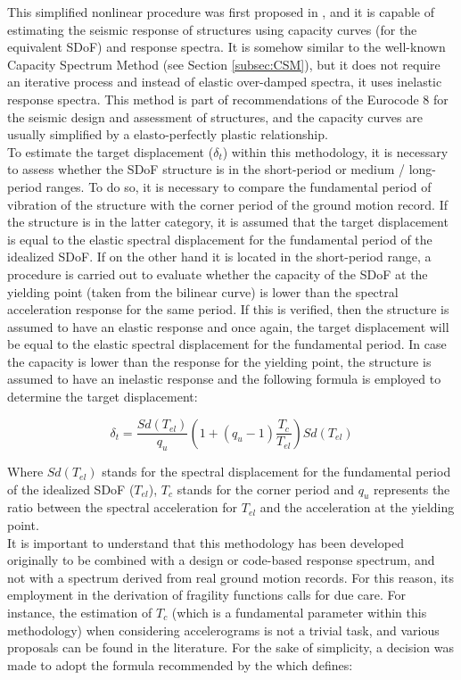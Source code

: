 This simplified nonlinear procedure was first proposed in \citet{Fajfar1996N2}, and it is capable of estimating the seismic response of structures using capacity curves (for the equivalent SDoF) and response spectra. It is somehow similar to the well-known Capacity Spectrum Method (see Section \ref{subsec:CSM}), but it does not require an iterative process and instead of elastic over-damped spectra, it uses inelastic response spectra. This method is part of recommendations of the Eurocode 8 \citep{CEN2005} for the seismic design and assessment of structures, and the capacity curves are usually simplified by a elasto-perfectly plastic relationship.\\

To estimate the target displacement ($\delta_t$) within this methodology, it is necessary to assess whether the SDoF structure is in the short-period or medium / long-period ranges. To do so, it is necessary to compare the fundamental period of vibration of the structure with the corner period of the ground motion record. If the structure is in the latter category, it is assumed that the target displacement is equal to the elastic spectral displacement for the fundamental period of the idealized SDoF. If on the other hand it is located in the short-period range, a procedure is carried out to evaluate whether the capacity of the SDoF at the yielding point (taken from the bilinear curve) is lower than the spectral acceleration response for the same period. If this is verified, then the structure is assumed to have an elastic response and once again, the target displacement will be equal to the elastic spectral displacement for the fundamental period. In case the capacity is lower than the response for the yielding point, the structure is assumed to have an inelastic response and the following formula is employed to determine the target displacement:

\begin{equation}
\delta_t = \frac{Sd(T_{el})}{q_u}\left(1+(q_u-1)\frac{T_c}{T_{el}}\right)Sd(T_{el})
\end{equation}

Where $Sd(T_{el})$ stands for the spectral displacement for the fundamental period of the idealized SDoF ($T_{el}$), $T_c$ stands for the corner period and $q_u$ represents the ratio between the spectral acceleration for $T_{el}$ and the acceleration at the yielding point.\\

It is important to understand that this methodology has been developed originally to be combined with a design or code-based response spectrum, and not with a spectrum derived from real ground motion records. For this reason, its employment in the derivation of fragility functions calls for due care. For instance, the estimation of $T_c$ (which is a fundamental parameter within this methodology) when considering accelerograms is not a trivial task, and various proposals can be found in the literature. For the sake of simplicity, a decision was made to adopt the formula recommended by the \cite{ASCE2010} which defines:

